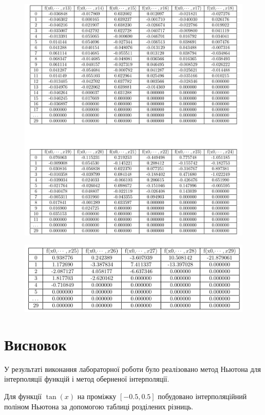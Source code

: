 \documentclass[a4paper, 12pt]{article}
\begin{document}
\begin{figure}[ht]
	\centering
	\includegraphics[width=1\linewidth]{./img/t23-4.png}
\end{figure}

\begin{figure}[ht]
	\centering
	\includegraphics[width=1\linewidth]{./img/t25.png}
\end{figure}

\clearpage
\newpage
\section{Висновок}

У результаті виконання лабораторної роботи було реалізовано метод Ньютона для інтерполяції функцій і метод оберненої інтерполяції.

Для функції $\tan(x)$ на проміжку $[-0.5, 0.5]$ побудовано інтерполяційний поліном Ньютона за допомогою таблиці розділених різниць.
\end{document}
